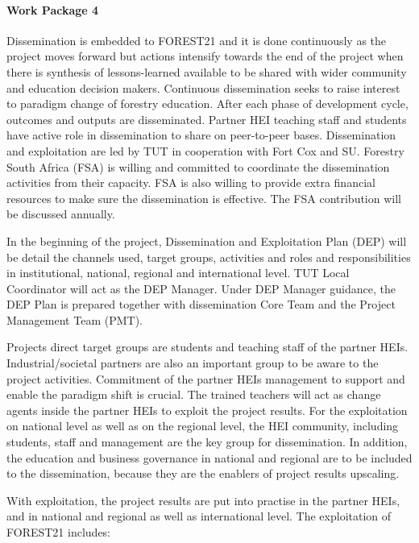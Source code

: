 \documentclass[
  11pt,
]{article}
\begin{document}
\hypertarget{work-package-4}{%
\paragraph{Work Package 4}\label{work-package-4}}

Dissemination is embedded to FOREST21 and it is done continuously as the
project moves forward but actions intensify towards the end of the
project when there is synthesis of lessons-learned available to be
shared with wider community and education decision makers. Continuous
dissemination seeks to raise interest to paradigm change of forestry
education. After each phase of development cycle, outcomes and outputs
are disseminated. Partner HEI teaching staff and students have active
role in dissemination to share on peer-to-peer bases. Dissemination and
exploitation are led by TUT in cooperation with Fort Cox and SU.
Forestry South Africa (FSA) is willing and committed to coordinate the
dissemination activities from their capacity. FSA is also willing to
provide extra financial resources to make sure the dissemination is
effective. The FSA contribution will be discussed annually.

In the beginning of the project, Dissemination and Exploitation Plan
(DEP) will be detail the channels used, target groups, activities and
roles and responsibilities in institutional, national, regional and
international level. TUT Local Coordinator will act as the DEP Manager.
Under DEP Manager guidance, the DEP Plan is prepared together with
dissemination Core Team and the Project Management Team (PMT).

Projects direct target groups are students and teaching staff of the
partner HEIs. Industrial/societal partners are also an important group
to be aware to the project activities. Commitment of the partner HEIs
management to support and enable the paradigm shift is crucial. The
trained teachers will act as change agents inside the partner HEIs to
exploit the project results. For the exploitation on national level as
well as on the regional level, the HEI community, including students,
staff and management are the key group for dissemination. In addition,
the education and business governance in national and regional are to be
included to the dissemination, because they are the enablers of project
results upscaling.

With exploitation, the project results are put into practise in the
partner HEIs, and in national and regional as well as international
level. The exploitation of FOREST21 includes:
\end{document}
